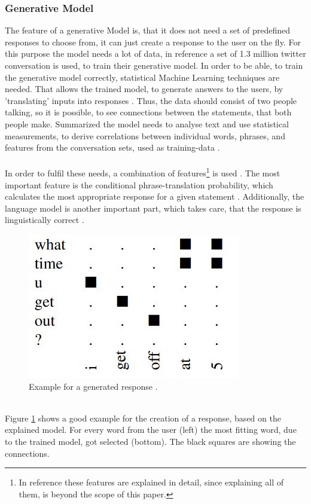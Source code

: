 \documentclass[10pt,final,journal,a4paper,oneside,twocolumn]{IEEEtran}
\begin{document}
\subsubsection{Generative Model}\label{sec::gm}
The feature of a generative Model is, that it does not need a set of predefined responses to choose from, it can just create a response to the user on the fly. For this purpose the model needs a lot of data, in reference \cite{b14} a set of 1.3 million twitter conversation is used, to train their generative model. In order to be able, to train the generative model correctly, statistical Machine Learning techniques are needed. That allows the trained model, to generate answers to the users, by 'translating' inputs into responses \cite{b6}. Thus, the data should consist of two people talking, so it is possible, to see connections between the statements, that both people make. Summarized the model needs to analyse text and use statistical measurements, to derive correlations between individual words, phrases, and features from the conversation sets, used as training-data \cite{b14}.\\
\\
In order to fulfil these needs, a combination of features\footnote{In reference \cite{b14} these features are explained in detail, since explaining all of them, is beyond the scope of this paper.} is used \cite{b14}. The most important feature is the conditional phrase-translation probability, which calculates the most appropriate response for a given statement \cite{b14}. Additionally, the language model is another important part, which takes care, that the response is linguistically correct \cite{b14}.
\begin{figure}[htbp]
	\centerline{\includegraphics[width=0.7\linewidth]{pictures/generate.jpg}}
	\caption{Example for a generated response \cite{b14}.}
	\label{generate}
\end{figure}
\\Figure \ref{generate} shows a good example for the creation of a response, based on the explained model. For every word from the user (left) the most fitting word, due to the trained model, got selected (bottom). The black squares are showing the connections.\\
\end{document}
